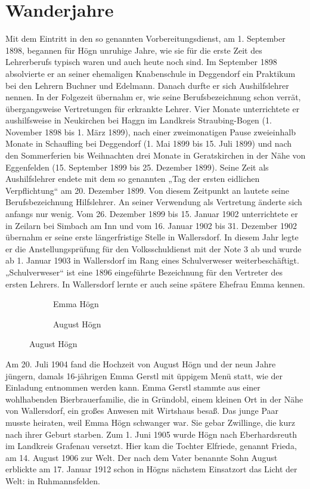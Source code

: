 \section{Wanderjahre}

Mit dem Eintritt in den so genannten Vorbereitungsdienst, am 1.
September 1898, begannen für Högn unruhige Jahre, wie sie für die erste
Zeit des Lehrerberufs typisch waren und auch heute noch sind. Im
September 1898 absolvierte er an seiner ehemaligen Knabenschule in
Deggendorf ein Praktikum bei den Lehrern Buchner und Edelmann. Danach
durfte er sich Aushilfslehrer nennen. In der Folgezeit übernahm er, wie
seine Berufsbezeichnung schon verrät, übergangsweise Vertretungen für
erkrankte Lehrer. Vier Monate unterrichtete er aushilfsweise in
Neukirchen bei Haggn im Landkreis Straubing-Bogen (1. November 1898 bis
1. März 1899), nach einer zweimonatigen Pause zweieinhalb Monate in
Schaufling bei Deggendorf (1. Mai 1899 bis 15. Juli 1899) und nach den
Sommerferien bis Weihnachten drei Monate in Geratskirchen in der Nähe
von Eggenfelden (15. September 1899 bis 25. Dezember 1899). Seine Zeit
als Aushilfslehrer endete mit dem so genannten „Tag der ersten
eidlichen Verpflichtung“ am 20. Dezember 1899. Von diesem Zeitpunkt
an lautete seine Berufsbezeichnung Hilfslehrer. An seiner Verwendung
als Vertretung änderte sich anfangs nur wenig. Vom 26. Dezember 1899
bis 15. Januar 1902 unterrichtete er in Zeilarn bei Simbach am Inn und
vom 16. Januar 1902 bis 31. Dezember 1902 übernahm er seine erste
längerfristige Stelle in Wallersdorf. In diesem Jahr legte er die
Anstellungsprüfung für den Volksschuldienst mit der Note 3 ab und wurde
ab 1. Januar 1903 in Wallersdorf im Rang eines Schulverweser
weiterbeschäftigt. „Schulverweser“ ist eine 1896 eingeführte
Bezeichnung für den Vertreter des ersten Lehrers. In Wallersdorf
lernte er auch seine spätere Ehefrau Emma kennen.

\begin{figure}

\begin{subfigure}[b]{0.5\linewidth}
\caption{Emma Högn}
\end{subfigure}%
%
\begin{subfigure}[b]{0.5\linewidth}
\caption{August Högn}
\end{subfigure}

\end{figure}

Am 20. Juli 1904 fand die Hochzeit von August Högn und der neun Jahre
jüngern, damals 16-jährigen Emma Gerstl mit üppigem Menü statt, wie der
Einladung entnommen werden kann. Emma Gerstl stammte aus einer
wohlhabenden Bierbrauerfamilie, die in Gründobl, einem kleinen Ort in
der Nähe von Wallersdorf, ein großes Anwesen mit Wirtshaus besaß. Das
junge Paar musste heiraten, weil Emma Högn schwanger war. Sie gebar
Zwillinge, die kurz nach ihrer Geburt starben. Zum 1. Juni 1905 wurde
Högn nach Eberhardsreuth im Landkreis Grafenau versetzt. Hier kam die
Tochter Elfriede, genannt Frieda, am 14. August 1906 zur Welt. Der nach
dem Vater benannte Sohn August erblickte am 17. Januar 1912 schon in
Högns nächstem Einsatzort das Licht der Welt: in Ruhmannsfelden.


